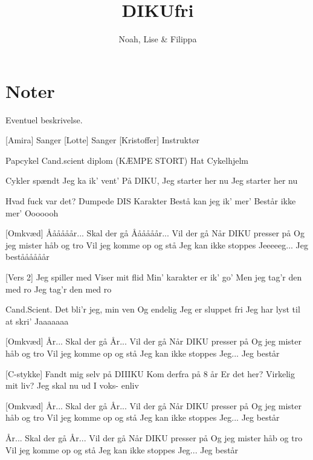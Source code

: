 \documentclass{article}
\title{DIKUfri}                   %
\author{Noah, Lise \& Filippa}  %
\begin{document}
                
\maketitle
\section*{Noter}                %
Eventuel beskrivelse.

\begin{roles}
[Amira] Sanger
[Lotte] Sanger
[Kristoffer] Instruktør
\end{roles}

\begin{props}
     Papcykel
     Cand.scient diplom (KÆMPE STORT)
      Hat
      Cykelhjelm
\end{props}

\newpage%
\begin{song}
[Vers 1]
%
Cykler spændt
Jeg ka ik’ vent’
På DIKU, 
Jeg starter her nu
Jeg starter her nu

%
Hvad fuck var det?
Dumpede DIS
Karakter
Bestå kan jeg ik’ mer’
Består ikke mer’
Ooooooh


[Omkvæd]
%
Åååååår... Skal der gå
Åååååår... Vil der gå
Når DIKU presser på
Og jeg mister håb og tro
Vil jeg komme op og stå
Jeg kan ikke stoppes
Jeeeeeg... Jeg beståååååår


[Vers 2]
%
Jeg spiller med
Viser mit flid
Min’ karakter er ik’ go’
Men jeg tag’r den med ro
Jeg tag’r den med ro

%
Cand.Scient.
Det bli’r jeg, min ven
Og endelig
Jeg er sluppet fri
Jeg har lyst til at skri’
Jaaaaaaa


[Omkvæd]
%
År... Skal der gå
År... Vil der gå
Når DIKU presser på
Og jeg mister håb og tro
Vil jeg komme op og stå
Jeg kan ikke stoppes
Jeg... Jeg består


[C-stykke]
%
Fandt mig selv
på DIIIKU
%
Kom derfra
på 8 år
%
Er det her?
Virkelig mit liv?
%
Jeg skal nu ud
I voks- enliv


[Omkvæd]
%
År... Skal der gå
År... Vil der gå
Når DIKU presser på
Og jeg mister håb og tro
Vil jeg komme op og stå
Jeg kan ikke stoppes
Jeg... Jeg består

År... Skal der gå
År... Vil der gå
Når DIKU presser på
Og jeg mister håb og tro
Vil jeg komme op og stå
Jeg kan ikke stoppes
Jeg... Jeg består

\end{song}
\end{document}

